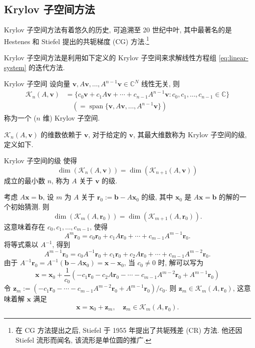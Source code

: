 \subsection{Krylov 子空间方法}\label{sec:krylov-subspace-methods}

Krylov 子空间方法有着悠久的历史, 可追溯至 20 世纪中叶, 其中最著名的是 Hestenes 和 Stiefel 提出的共轭梯度 (CG) 方法.\footnote{在 CG 方法提出之后, Stiefel 于 1955 年提出了共轭残差 (CR) 方法. 他还因 Stiefel 流形而闻名, 该流形是单位圆的推广.}

Krylov 子空间方法是利用如下定义的 Krylov 子空间来求解线性方程组 \eqref{eq:linear-system} 的迭代方法.

\begin{Definition}{Krylov 子空间}\label{def:krylov-subspace}
设向量 $\bm v,A\bm v,\ldots,A^{n-1}\bm v\in\mathbb C^N$ 线性无关, 则
\begin{equation}\label{eq:krylov-subspace-span}
\begin{aligned}
\mathcal K_n(A,\bm v)&=\{c_0\bm v+c_1A\bm v+\cdots+c_{n-1}A^{n-1}\bm v:c_0,c_1,\ldots,c_{n-1}\in\mathbb C\}\\
&\quad(=\operatorname{span}\{\bm v,A\bm v,\ldots,A^{n-1}\bm v\})
\end{aligned}
\end{equation}
称为一个 ($n$ 维) Krylov 子空间.
\end{Definition}

$\mathcal K_n(A,\bm v)$ 的维数依赖于 $\bm v$, 对于给定的 $\bm v$, 其最大维数称为 Krylov 子空间的级, 定义如下.

\begin{Definition}{Krylov 子空间的级}\label{def:krylov-grade}
使得
\begin{equation}\label{eq:krylov-grade-stabilization}
\dim(\mathcal K_n(A,\bm v))=\dim(\mathcal K_{n+1}(A,\bm v))
\end{equation}
成立的最小数 $n$, 称为 $A$ 关于 $\bm v$ 的级.
\end{Definition}

考虑 $A\bm x=\bm b$, 设 $m$ 为 $A$ 关于 $\bm r_0:=\bm b-A\bm x_0$ 的级, 其中 $\bm x_0$ 是 $A\bm x=\bm b$ 的解的一个初始猜测. 则
\[
\dim(\mathcal K_m(A,\bm r_0))=\dim(\mathcal K_{m+1}(A,\bm r_0)).
\]
这意味着存在 $c_0,c_1,\ldots,c_{m-1}$, 使得
\[
A^m\bm r_0=c_0\bm r_0+c_1A\bm r_0+\cdots+c_{m-1}A^{m-1}\bm r_0.
\]
将等式乘以 $A^{-1}$, 得到
\[
A^{m-1}\bm r_0=c_0A^{-1}\bm r_0+c_1\bm r_0+c_2A\bm r_0+\cdots+c_{m-1}A^{m-2}\bm r_0.
\]
由于 $A^{-1}\bm r_0=A^{-1}(\bm b-A\bm x_0)=\bm x-\bm x_0$, 当 $c_0\ne0$ 时, 解可以写为
\[
\bm x=\bm x_0+\frac{1}{c_0}(-c_1\bm r_0-c_2A\bm r_0-\cdots-c_{m-1}A^{m-2}\bm r_0+A^{m-1}\bm r_0)
\]
令 $\bm z_m:=(-c_1\bm r_0-\cdots-c_{m-1}A^{m-2}\bm r_0+A^{m-1}\bm r_0)/c_0$. 则 $\bm z_m\in\mathcal K_m(A,\bm r_0)$, 这意味着解 $\bm x$ 满足
\[
\bm x=\bm x_0+\bm z_m,\quad\bm z_m\in\mathcal K_m(A,\bm r_0).
\]

